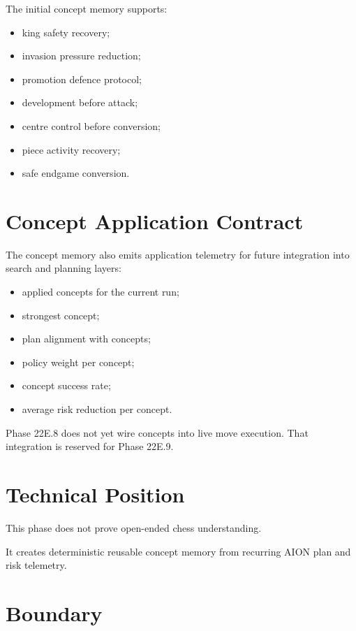 \documentclass[11pt,a4paper]{article}
\begin{document}
The initial concept memory supports:

\begin{itemize}[leftmargin=*]
  \item king safety recovery;
  \item invasion pressure reduction;
  \item promotion defence protocol;
  \item development before attack;
  \item centre control before conversion;
  \item piece activity recovery;
  \item safe endgame conversion.
\end{itemize}


\section{Concept Application Contract}

The concept memory also emits application telemetry for future integration into search and planning layers:

\begin{itemize}[leftmargin=*]
  \item applied concepts for the current run;
  \item strongest concept;
  \item plan alignment with concepts;
  \item policy weight per concept;
  \item concept success rate;
  \item average risk reduction per concept.
\end{itemize}

Phase 22E.8 does not yet wire concepts into live move execution. That integration is reserved for Phase 22E.9.

\section{Technical Position}

This phase does not prove open-ended chess understanding.

It creates deterministic reusable concept memory from recurring AION plan and risk telemetry.

\section{Boundary}
\end{document}
